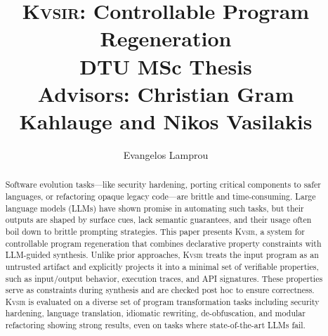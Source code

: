 \documentclass[nonacm,sigplan,review]{acmart}
\newcommand{\sys}{{\scshape Kv{\textalpha}sir}\xspace}
\begin{document}
\title[Controllable Program Regeneration]{\sys: Controllable Program Regeneration\\{\vspace{1em}\normalsize DTU MSc Thesis \\ Advisors: Christian Gram Kahlauge and Nikos Vasilakis}}
\author[Evangelos Lamprou]{Evangelos Lamprou}



\begin{abstract}
  Software evolution tasks---like security hardening, porting critical components to safer 
  languages, or refactoring opaque legacy code---are brittle and time-consuming.
  Large language models (LLMs) have shown promise in automating such tasks,
  but their outputs are shaped by surface cues, lack
  semantic guarantees, and their usage often boil down to brittle prompting strategies.
This paper presents \sys, a system for controllable program regeneration that
  combines declarative property constraints with LLM-guided synthesis. Unlike
  prior approaches, \sys treats the input program as an untrusted artifact and
  explicitly projects it into a minimal set of verifiable properties, such as
  input/output behavior, execution traces, and API signatures. These properties
  serve as constraints during synthesis and are checked post hoc to ensure
  correctness.
\sys is evaluated on a diverse set of program transformation tasks
including security hardening, language translation, idiomatic rewriting, de-obfuscation,
and modular refactoring showing strong results, even on tasks where state-of-the-art LLMs fail.
\end{abstract}
\maketitle
\end{document}
